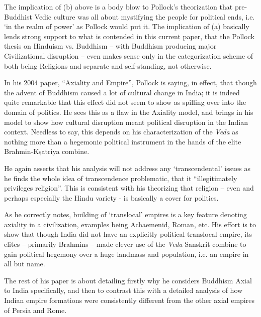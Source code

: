 The implication of (b) above is a body blow to Pollock’s theorization that pre-Buddhist Vedic culture was all about mystifying the people for political ends, i.e. ‘in the realm of power’ as Pollock would put it. The implication of (a) basically lends strong support to what is contended in this current paper, that the Pollock thesis on Hinduism vs. Buddhism – with Buddhism producing major Civilizational disruption – even makes sense only in the categorization scheme of both being Religions and separate and self-standing, not otherwise.

In his 2004 paper, “Axiality and Empire”, Pollock is saying, in effect, that though the advent of Buddhism caused a lot of cultural change in India; it is indeed quite remarkable that this effect did not seem to show as spilling over into the domain of politics. He sees this as a flaw in the Axiality model, and brings in his model to show how cultural disruption meant political disruption in the Indian context. Needless to say, this depends on his characterization of the \textit{Veda} as nothing more than a hegemonic political instrument in the hands of the elite Brahmin-Kṣatriya combine.

He again asserts that his analysis will not address any ‘transcendental’ issues as he finds the whole idea of transcendence problematic, that it “illegitimately privileges religion”. This is consistent with his theorizing that religion – even and perhaps especially the Hindu variety - is basically a cover for politics.

As he correctly notes, building of ‘translocal’ empires is a key feature denoting axiality in a civilization, examples being Achaemenid, Roman, etc. His effort is to show that though India did not have an explicitly political translocal empire, its elites – primarily Brahmins – made clever use of the \textit{Veda}-Sanskrit combine to gain political hegemony over a huge landmass and population, i.e. an empire in all but name.

The rest of his paper is about detailing firstly why he considers Buddhism Axial to India specifically, and then to contrast this with a detailed analysis of how Indian empire formations were consistently different from the other axial empires of Persia and Rome.

\vspace{.1cm}

